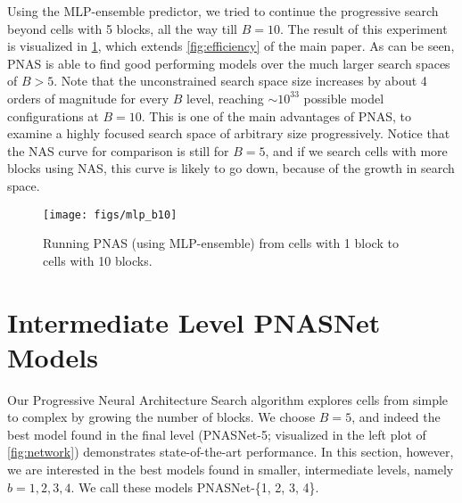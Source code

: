\documentclass[runningheads]{llncs}
\begin{document}

Using the MLP-ensemble predictor, we tried to continue the progressive search beyond cells with 5 blocks, all the way till $B = 10$.
The result of this experiment is visualized in \cref{fig:b10}, which extends \cref{fig:efficiency} of the main paper.
As can be seen, PNAS is able to find good performing models over the much larger search spaces of $B>5$. Note that the unconstrained search space size increases by about 4 orders of magnitude for every $B$ level, reaching $\sim 10^{33}$ possible model configurations at $B=10$. This is one of the main advantages of PNAS, to examine a highly focused search space of arbitrary size progressively.
Notice that the NAS curve for comparison is still for $B = 5$, and if we search cells with more blocks using NAS, this curve is likely to go down, because of the growth in search space.

\begin{figure}[h]
\centering 
\texttt{[image: figs/mlp\_b10]}
\caption{Running PNAS (using MLP-ensemble) from cells with 1 block to cells with 10 blocks.}
\label{fig:b10}
\end{figure}\section{Intermediate Level PNASNet Models}

Our Progressive Neural Architecture Search algorithm explores cells from simple to complex by growing the number of blocks.
We choose $B=5$, and indeed the best model found in the final level (PNASNet-5; visualized in the left plot of \cref{fig:network}) demonstrates state-of-the-art performance.
In this section, however, we are interested in the best models found in smaller, intermediate levels, namely $b = 1, 2, 3, 4$.
We call these models PNASNet-\{1, 2, 3, 4\}.
\end{document}

